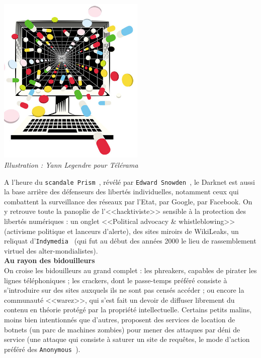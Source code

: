 \documentclass[11pt,twoside,a4paper]{article}
\begin{document}
\begin{minipage}[ht]{7.25cm}
	\includegraphics[width=7.00cm]{img/darknet-immersion-en-reseaux-troubles,M124681.jpg}~\\
	\emph{Illustration : Yann Legendre pour T{\'e}l{\'e}rama }~\\
\end{minipage} \hfill \begin{minipage}[ht]{12.00cm}
	A l'heure du \texttt{scandale Prism~\footnotemark }, r{\'e}v{\'e}l{\'e} par \texttt{Edward Snowden~\footnotemark }, le Darknet est aussi la base arri{\`e}re des d{\'e}fenseurs des libert{\'e}s individuelles, notamment ceux qui combattent la surveillance des r{\'e}seaux par l'Etat, par Google, par Facebook. On y retrouve toute la panoplie de l'<<hacktiviste>> sensible {\`a} la protection des libert{\'e}s num{\'e}riques : un onglet <<Political advocacy \& whistleblowing>> (activisme politique et lanceurs d'alerte), des sites miroirs de WikiLeaks, un reliquat d'\texttt{Indymedia~\footnotemark } (qui fut au d{\'e}but des ann{\'e}es 2000 le lieu de rassemblement virtuel des alter-mondialistes). ~\\
	
	\textbf{\large Au rayon des bidouilleurs}~\\

	On croise les bidouilleurs au grand complet : les phreakers, capables de pirater les lignes t{\'e}l{\'e}phoniques ; les crackers, dont le passe-temps pr{\'e}f{\'e}r{\'e} consiste {\`a} s'introduire sur des sites auxquels ils ne sont pas cens{\'e}s acc{\'e}der ; ou encore la communaut{\'e} <<warez>>, qui s'est fait un devoir de diffuser librement du contenu en th{\'e}orie prot{\'e}g{\'e} par la propri{\'e}t{\'e} intellectuelle. Certains petits malins, moins bien intentionn{\'e}s que d'autres, proposent des services de location de botnets (un parc de machines zombies) pour mener des attaques par d{\'e}ni de service (une attaque qui consiste {\`a} saturer un site de requ{\^e}tes, le mode d'action pr{\'e}f{\'e}r{\'e} des \texttt{Anonymous~\footnotemark }). ~\\
\end{minipage}~\\
\end{document}
